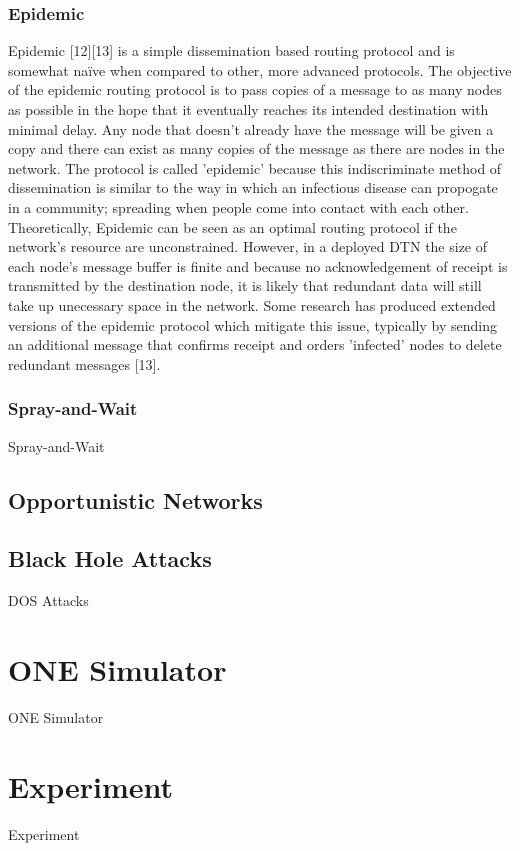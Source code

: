 \documentclass{article}
\begin{document}
\subsubsection{Epidemic}
Epidemic [12][13] is a simple dissemination based routing protocol and is somewhat naïve when compared to other, more advanced protocols. The objective of the epidemic routing protocol is to pass copies of a message to as many nodes as possible in the hope that it eventually reaches its intended destination with minimal delay. Any node that doesn't already have the message will be given a copy and there can exist as many copies of the message as there are nodes in the network. The protocol is called 'epidemic' because this indiscriminate method of dissemination is similar to the way in which an infectious disease can propogate in a community; spreading when people come into contact with each other.\\
\newline Theoretically, Epidemic can be seen as an optimal routing protocol if the network's resource are unconstrained. However, in a deployed DTN the size of each node's message buffer is finite and because no acknowledgement of receipt is transmitted by the destination node, it is likely that redundant data will still take up unecessary space in the network. Some research has produced extended versions of the epidemic protocol which mitigate this issue, typically by sending an additional message that confirms receipt and orders 'infected' nodes to delete redundant messages [13].

\subsubsection{Spray-and-Wait}
Spray-and-Wait

\subsection{Opportunistic Networks}

\subsection{Black Hole Attacks}
DOS Attacks

\section{ONE Simulator}
ONE Simulator

\section{Experiment}
Experiment
\end{document}
